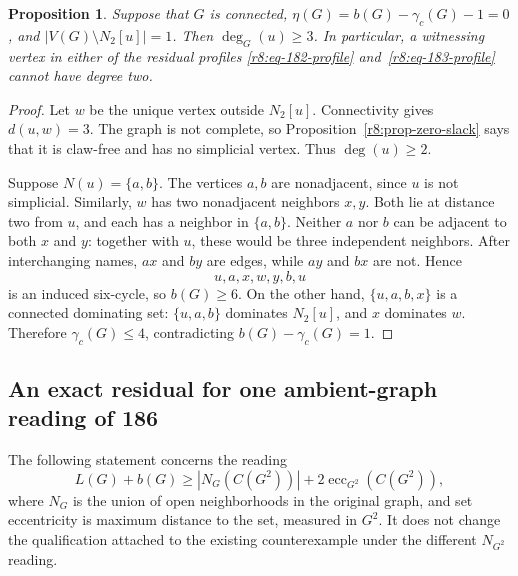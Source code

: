 \documentclass[11pt,a4paper]{article}
\newtheorem{proposition}[theorem]{Proposition}
\theoremstyle{remark}
\begin{document}
\begin{proposition}\label{r9:prop-two-ball-degree}
Suppose that $G$ is connected, $\eta(G)=b(G)-\gamma_c(G)-1=0$,
and $|V(G)\setminus N_2[u]|=1$.  Then $\deg_G(u)\ge3$.
In particular, a witnessing vertex in either of the residual profiles
\eqref{r8:eq-182-profile} and~\eqref{r8:eq-183-profile} cannot have
degree two.
\end{proposition}
\begin{proof}
Let $w$ be the unique vertex outside $N_2[u]$.  Connectivity gives
$d(u,w)=3$.  The graph is not complete, so
Proposition~\ref{r8:prop-zero-slack} says that it is claw-free and
has no simplicial vertex.  Thus $\deg(u)\ge2$.

Suppose $N(u)=\{a,b\}$.  The vertices $a,b$ are nonadjacent, since
$u$ is not simplicial.  Similarly, $w$ has two nonadjacent neighbors
$x,y$.  Both lie at distance two from $u$, and each has a neighbor
in $\{a,b\}$.  Neither $a$ nor $b$ can be adjacent to both $x$ and
$y$: together with $u$, these would be three independent neighbors.
After interchanging names, $ax$ and $by$ are edges, while $ay$ and
$bx$ are not.  Hence
\[
 u,a,x,w,y,b,u
\]
is an induced six-cycle, so $b(G)\ge6$.  On the other hand,
$\{u,a,b,x\}$ is a connected dominating set: $\{u,a,b\}$
dominates $N_2[u]$, and $x$ dominates $w$.  Therefore
$\gamma_c(G)\le4$, contradicting $b(G)-\gamma_c(G)=1$.
\end{proof}

\subsection{An exact residual for one ambient-graph reading of 186}
\label{r9:subsec-186-residual}

The following statement concerns the reading
\begin{equation}\label{r9:eq-186-reading}
 L(G)+b(G)\ge |N_G(C(G^2))|+
             2\operatorname{ecc}_{G^2}(C(G^2)),
\end{equation}
where $N_G$ is the union of open neighborhoods in the original graph,
and set eccentricity is maximum distance to the set, measured in
$G^2$.  It does not change the qualification attached to the existing
counterexample under the different $N_{G^2}$ reading.
\end{document}
